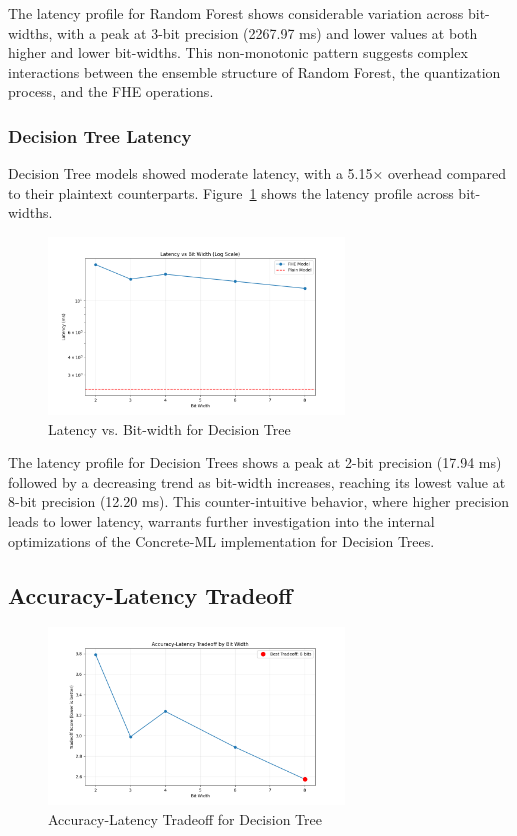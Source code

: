 \documentclass[a4paper,12pt]{article}
\begin{document}
The latency profile for Random Forest shows considerable variation across bit-widths, with a peak at 3-bit precision (2267.97 ms) and lower values at both higher and lower bit-widths. This non-monotonic pattern suggests complex interactions between the ensemble structure of Random Forest, the quantization process, and the FHE operations.

\subsubsection{Decision Tree Latency}
Decision Tree models showed moderate latency, with a 5.15× overhead compared to their plaintext counterparts. Figure~\ref{fig:dt_latency_vs_bitwidth} shows the latency profile across bit-widths.

\begin{figure}[h]
\centering
\includegraphics[width=0.7\textwidth]{results/dt/dt_latency.png}
\caption{Latency vs. Bit-width for Decision Tree}
\label{fig:dt_latency_vs_bitwidth}
\end{figure}

The latency profile for Decision Trees shows a peak at 2-bit precision (17.94 ms) followed by a decreasing trend as bit-width increases, reaching its lowest value at 8-bit precision (12.20 ms). This counter-intuitive behavior, where higher precision leads to lower latency, warrants further investigation into the internal optimizations of the Concrete-ML implementation for Decision Trees.

\subsection{Accuracy-Latency Tradeoff}
\begin{figure}[h]
\centering
\includegraphics[width=0.7\textwidth]{results/dt/dt_tradeoff.png}
\caption{Accuracy-Latency Tradeoff for Decision Tree}
\label{fig:dt_accuracy_latency_tradeoff}
\end{figure}
\end{document}
